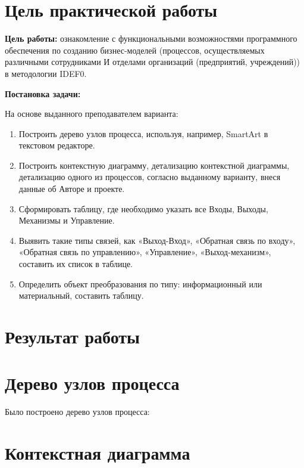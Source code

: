 
\section*{\LARGE Цель практической работы}

\textbf{Цель работы:} ознакомление с функциональными возможностями программного обеспечения по созданию бизнес-моделей
(процессов, осуществляемых различными сотрудниками И отделами организаций (предприятий, учреждений))
в методологии IDEF0.



\textbf{Постановка задачи:}\par
На основе выданного преподавателем варианта:

\begin{enumerate}
	\item Построить дерево узлов процесса, используя, например, SmartArt в текстовом редакторе.
	\item Построить контекстную диаграмму, детализацию контекстной диаграммы, детализацию одного из процессов, согласно выданному варианту, внеся данные об Авторе и проекте.
	\item Сформировать таблицу, где необходимо указать все Входы, Выходы, Механизмы и Управление.
	\item Выявить такие типы связей, как «Выход-Вход», «Обратная связь по входу», «Обратная связь по управлению», «Управление», «Выход-механизм», составить их список в таблице.
	\item Определить объект преобразования по типу: информационный или материальный, составить таблицу.
\end{enumerate}


\newpage

\section*{\LARGE Результат работы}

\section{Дерево узлов процесса}

Было построено дерево узлов процесса:


\newpage


\section{Контекстная диаграмма}

